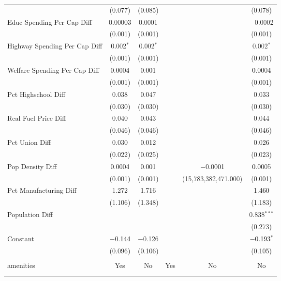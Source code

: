 \begin{table}[!htbp]
\begin{tabular}{@{\extracolsep{5pt}}lccccc}
  & (0.077) & (0.085) &  &  & (0.078) \\ 
  Educ Spending Per Cap Diff & 0.00003 & 0.0001 &  &  & $-$0.0002 \\ 
  & (0.001) & (0.001) &  &  & (0.001) \\ 
  Highway Spending Per Cap Diff & 0.002$^{*}$ & 0.002$^{*}$ &  &  & 0.002$^{*}$ \\ 
  & (0.001) & (0.001) &  &  & (0.001) \\ 
  Welfare Spending Per Cap Diff & 0.0004 & 0.001 &  &  & 0.0004 \\ 
  & (0.001) & (0.001) &  &  & (0.001) \\ 
  Pct Highschool Diff & 0.038 & 0.047 &  &  & 0.033 \\ 
  & (0.030) & (0.030) &  &  & (0.030) \\ 
  Real Fuel Price Diff & 0.040 & 0.043 &  &  & 0.044 \\ 
  & (0.046) & (0.046) &  &  & (0.046) \\ 
  Pct Union Diff & 0.030 & 0.012 &  &  & 0.026 \\ 
  & (0.022) & (0.025) &  &  & (0.023) \\ 
  Pop Density Diff & 0.0004 & 0.001 &  & $-$0.0001 & 0.0005 \\ 
  & (0.001) & (0.001) &  & (15,783,382,471.000) & (0.001) \\ 
  Pct Manufacturing Diff & 1.272 & 1.716 &  &  & 1.460 \\ 
  & (1.106) & (1.348) &  &  & (1.183) \\ 
  Population Diff &  &  &  &  & 0.838$^{***}$ \\ 
  &  &  &  &  & (0.273) \\ 
  Constant & $-$0.144 & $-$0.126 &  &  & $-$0.193$^{*}$ \\ 
  & (0.096) & (0.106) &  &  & (0.105) \\ 
 \hline \\[-1.8ex] 
amenities & Yes & No & Yes & No & No \\ 
\hline \\[-1.8ex] 
\hline 
\hline \\[-1.8ex] 
\end{tabular} 
\end{table} 
